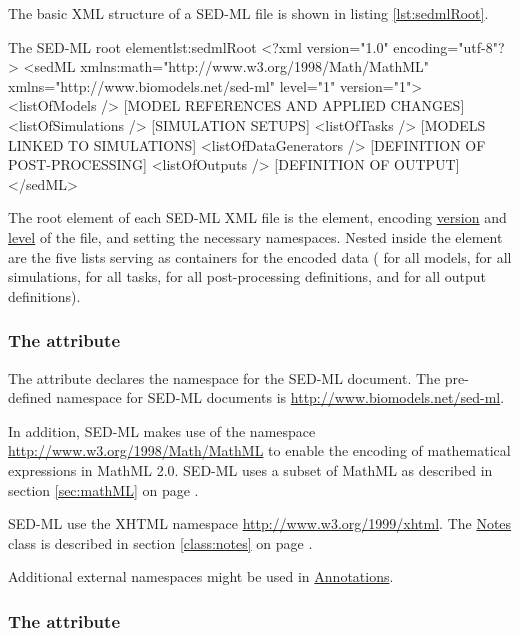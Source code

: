 The basic XML structure of a SED-ML file is shown in listing  \ref{lst:sedmlRoot}.
%
\begin{myXmlLst}{The SED-ML root element}{lst:sedmlRoot}
<?xml version="1.0" encoding="utf-8"?>
<sedML xmlns:math="http://www.w3.org/1998/Math/MathML" 
       xmlns="http://www.biomodels.net/sed-ml" level="1" version="1">
 <listOfModels />
  [MODEL REFERENCES AND APPLIED CHANGES]
 <listOfSimulations />
  [SIMULATION SETUPS]
 <listOfTasks />
  [MODELS LINKED TO SIMULATIONS]
 <listOfDataGenerators />
  [DEFINITION OF POST-PROCESSING]
 <listOfOutputs />
  [DEFINITION OF OUTPUT]
</sedML>
\end{myXmlLst}
%
The root element of each SED-ML XML file is the  element, encoding \hyperref[sec:version]{version} and \hyperref[sec:level]{level} of the file, and setting the necessary namespaces. Nested inside the  element are the five lists serving as containers for the encoded data ( for all models,  for all simulations,  for all tasks,  for all post-processing definitions, and  for all output definitions).

\subsubsection{The  attribute}
\label{sec:xmlns}
The  attribute declares the namespace for the SED-ML document. The pre-defined namespace for SED-ML documents is \url{http://www.biomodels.net/sed-ml}. 

In addition, SED-ML makes use of the  namespace \url{http://www.w3.org/1998/Math/MathML} to enable the encoding of mathematical expressions in MathML 2.0. SED-ML uses a subset of MathML as described in section \ref{sec:mathML} on page \pageref{sec:mathML}.

SED-ML  use the XHTML namespace \url{http://www.w3.org/1999/xhtml}.  The \hyperref[class:notes]{Notes} class is described in section \ref{class:notes} on page \pageref{class:notes}.

Additional external namespaces might be used in \hyperref[class:annotation]{Annotations}. 


\subsubsection{The  attribute}
\label{sec:level}

